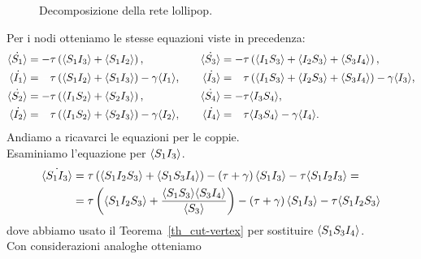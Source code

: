 \begin{figure}[!htb]
\centering
{}
\caption{Decomposizione della rete lollipop.}
\label{fig::lollipop_cut}
\end{figure}
Per i nodi otteniamo le stesse equazioni viste in precedenza:
\begin{equation*}
 \begin{aligned}
 \dot{\angol{S_1}}&= -\tau \tonde{ \angol{ S_1 I_3} + \angol{S_1 I_2}},  \quad 
 &\dot{\angol{S_3}}&= -\tau \tonde{ \angol{I_1 S_3} + \angol{I_2 S_3}+ \angol{S_3 I_4}},  \\
 \dot{\angol{I_1}}&= \spa \tau \tonde{ \angol{ S_1 I_2} + \angol{S_1 I_3}} - \gamma\angol{I_1},\quad 
 &\dot{\angol{I_3}}&= \spa \tau \tonde{ \angol{I_1 S_3} + \angol{I_2 S_3}+ \angol{S_3 I_4}}-\gamma\angol{I_3},\\
 \dot{\angol{S_2}}&= -\tau \tonde{ \angol{ I_1 S_2} + \angol{S_2 I_3}}, \quad &\dot{\angol{S_4}} &= -\tau \angol{I_3S_4},  \\
 \dot{\angol{I_2}}&= \spa \tau \tonde{ \angol{ I_1 S_2} + \angol{S_2 I_3}} - \gamma\angol{I_2},\quad & \dot{\angol{I_4}}&=\spa \tau\angol{I_3S_4}-\gamma\angol{I_4}. \\
 \end{aligned}	
 \end{equation*}
 Andiamo a ricavarci le equazioni per le coppie.\\ Esaminiamo l'equazione per $\langle S_1 I_3 \rangle$. 
 \begin{equation*}
 \begin{aligned}	
 \dot{\langle S_1I_3 \rangle}&= \tau\left(  \langle S_1I_2S_3 \rangle + \langle S_1S_3I_4 \rangle \right) - \left(  \tau +\gamma \right)\langle S_1 I_3 \rangle -\tau \langle  S_1 I_2 I_3 \rangle= \\
 &= \tau \left(  \langle S_1I_2S_3 \rangle + \frac{ \langle S_1S_3 \rangle\langle S_3 I_4 \rangle}{\langle S_3 \rangle} \right) -\left(  \tau + \gamma \right) \langle S_1I_3 \rangle - \tau \langle S_1I_2S_3 \rangle
 \end{aligned}
 \end{equation*}
 dove abbiamo usato il Teorema~\ref{th_cut-vertex} per sostituire $\langle S_1S_3I_4 \rangle$.\\
Con considerazioni analoghe otteniamo

